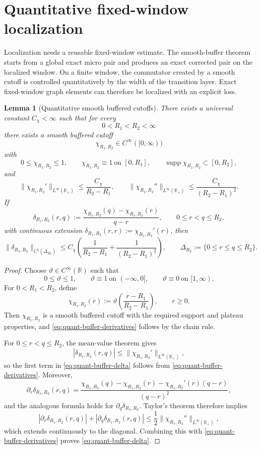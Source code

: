 \documentclass[11pt,a4paper]{amsart}
\theoremstyle{plain}
\newtheorem{lemma}[theorem]{Lemma}
\theoremstyle{definition}
\theoremstyle{remark}
\newcommand{\R}{\mathbb{R}}
\begin{document}
\section{Quantitative fixed-window localization}\label{sec:micro-window-buffer}

Localization needs a reusable fixed-window estimate.  The smooth-buffer theorem starts from a
global exact micro pair and produces an exact corrected pair on the localized window.  On a finite
window, the commutator created by a smooth cutoff is controlled quantitatively by the width of the
transition layer.  Exact fixed-window graph elements can therefore be localized with an explicit
loss.

\begin{lemma}[Quantitative smooth buffered cutoffs]
\label{lem:quant-buffer}
There exists a universal constant \(C_{\chi}<\infty\) such that for every
\[
0<R_1<R_2<\infty
\]
there exists a smooth buffered cutoff
\[
\chi_{R_1,R_2}\in C^\infty([0,\infty))
\]
with
\[
0\le \chi_{R_1,R_2}\le 1,
\qquad
\chi_{R_1,R_2}\equiv1\ \text{on }[0,R_1],
\qquad
\operatorname{supp}\chi_{R_1,R_2}\subset[0,R_2],
\]
and
\begin{equation}\label{eq:quant-buffer-derivatives}
\|\chi_{R_1,R_2}'\|_{L^\infty(\R_+)}
\le
\frac{C_{\chi}}{R_2-R_1},
\qquad
\|\chi_{R_1,R_2}''\|_{L^\infty(\R_+)}
\le
\frac{C_{\chi}}{(R_2-R_1)^2}.
\end{equation}
If
\[
\delta_{R_1,R_2}(r,q)
:=
\frac{\chi_{R_1,R_2}(q)-\chi_{R_1,R_2}(r)}{q-r},
\qquad 0\le r<q\le R_2,
\]
with continuous extension \(\delta_{R_1,R_2}(r,r):=\chi_{R_1,R_2}'(r)\), then
\begin{equation}\label{eq:quant-buffer-delta}
\|\delta_{R_1,R_2}\|_{C^1(\Delta_{R_2})}
\le
C_{\chi}
\left(
\frac{1}{R_2-R_1}
+
\frac{1}{(R_2-R_1)^2}
\right),
\qquad
\Delta_{R_2}:=\{0\le r\le q\le R_2\}.
\end{equation}
\end{lemma}

\begin{proof}
Choose \(\vartheta\in C^\infty(\R)\) such that
\[
0\le\vartheta\le1,
\qquad
\vartheta\equiv1\ \text{on }(-\infty,0],
\qquad
\vartheta\equiv0\ \text{on }[1,\infty).
\]
For \(0<R_1<R_2\), define
\[
\chi_{R_1,R_2}(r)
:=
\vartheta\!\left(\frac{r-R_1}{R_2-R_1}\right),
\qquad r\ge0.
\]
Then \(\chi_{R_1,R_2}\) is a smooth buffered cutoff with the required support and plateau
properties, and \eqref{eq:quant-buffer-derivatives} follows by the chain rule.

For \(0\le r<q\le R_2\), the mean-value theorem gives
\[
|\delta_{R_1,R_2}(r,q)|
\le
\|\chi_{R_1,R_2}'\|_{L^\infty(\R_+)},
\]
so the first term in \eqref{eq:quant-buffer-delta} follows from
\eqref{eq:quant-buffer-derivatives}. Moreover,
\[
\partial_r \delta_{R_1,R_2}(r,q)
=
\frac{\chi_{R_1,R_2}(q)-\chi_{R_1,R_2}(r)-\chi_{R_1,R_2}'(r)(q-r)}{(q-r)^2},
\]
and the analogous formula holds for \(\partial_q\delta_{R_1,R_2}\). Taylor's theorem therefore
implies
\[
|\partial_r\delta_{R_1,R_2}(r,q)|
+
|\partial_q\delta_{R_1,R_2}(r,q)|
\le
\frac12\|\chi_{R_1,R_2}''\|_{L^\infty(\R_+)},
\]
which extends continuously to the diagonal. Combining this with
\eqref{eq:quant-buffer-derivatives} proves \eqref{eq:quant-buffer-delta}.
\end{proof}
\end{document}
